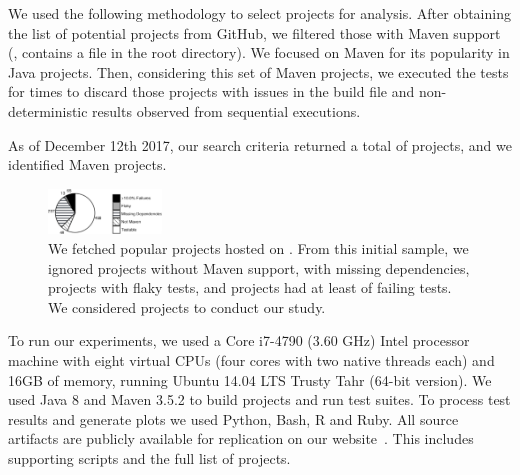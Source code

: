 We used the following methodology to select projects for analysis.
After obtaining the list of potential projects from GitHub, we filtered those
with Maven support (\ie, contains a \pomf{} file in the root directory).
We focused on Maven for its popularity in Java projects.
Then, considering this set of Maven projects, we executed the tests for
\SubjectsReruns{} times to discard those projects with issues in the build file
and non-deterministic results observed from sequential executions.

As of December 12th 2017, our search criteria returned a total of
\SubjectsGithub{} projects, and we identified \SubjectsMaven{} Maven projects.

\begin{figure}[h!]
  \centering
  \includegraphics[width=0.27\textwidth]{results/piechart-subjs.pdf}
  \caption{\label{fig:subjects}We fetched \SubjectsGithub{} popular projects
  hosted on \github{}. From this initial sample, we ignored
  \SubjectsGithubNotMaven{} projects without Maven support,
  \SubjectsGithubNotTestable{} with missing dependencies,
  \SubjectsGithubFlaky{} projects with flaky tests, and
  \SubjectsGithubTooManyFailures{} projects had at least
  \SuiteFailingThreshold{} of failing tests. We considered
  \numSubjs{} projects to conduct our study.}
\end{figure}

\label{sec:setup}
To run our experiments, we used a Core i7-4790 (3.60 GHz) Intel processor
machine with eight virtual CPUs (four cores with two native threads each) and
16GB of memory, running Ubuntu 14.04 LTS Trusty Tahr (64-bit version).
We used Java 8 and Maven 3.5.2 to build projects and run test suites.  To
process test results and generate plots we used Python, Bash, R and Ruby.
All source artifacts are publicly available for replication on our
website~\cite{ourwebpage}.
This includes supporting scripts and the full list of projects.

